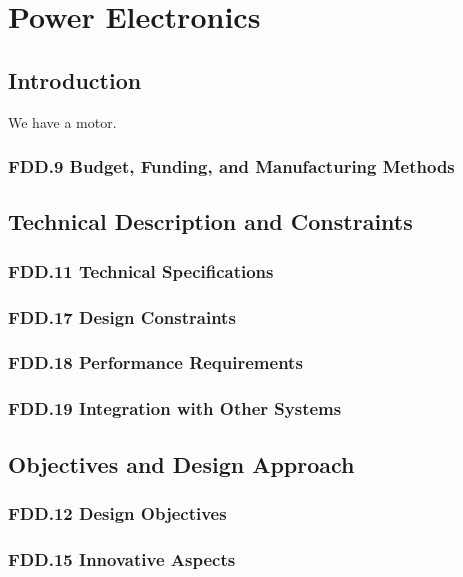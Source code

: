 \section{Power Electronics}

\subsection{Introduction}
We have a motor.
\subsubsection{FDD.9 Budget, Funding, and Manufacturing Methods}
 
\subsection{Technical Description and Constraints}
\subsubsection{FDD.11 Technical Specifications}

\subsubsection{FDD.17 Design Constraints}
 
\subsubsection{FDD.18 Performance Requirements}
 
\subsubsection{FDD.19 Integration with Other Systems}
 
\subsection{Objectives and Design Approach}
\subsubsection{FDD.12 Design Objectives}
 
\subsubsection{FDD.15 Innovative Aspects}
 
